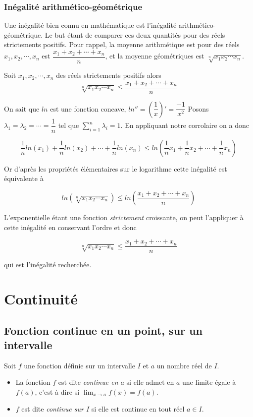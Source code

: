 \documentclass[french]{book}
\newcommand{\ie}{\leq}
\begin{document}
\subsection{Inégalité arithmético-géométrique }

Une inégalité bien connu en mathématique est l'inégalité arithmético-géométrique. Le but étant de comparer ces deux quantités pour des réels strictements positifs. Pour rappel, la moyenne arithmétique est pour des réels $x_1,x_2, \cdots , x_n$ est $\dfrac{x_1+x_2+\cdots+x_n}{n}$, et la moyenne géométriques est $\sqrt[n]{x_1x_2\cdots x_n}$.

\begin{thm}
Soit  $x_1,x_2, \cdots , x_n$ des réels strictements positifs alors 
$$\sqrt[n]{x_1x_2\cdots x_n} \ie \dfrac{x_1+x_2+\cdots+x_n}{n} $$
\end{thm}

\begin{demo}
On sait que $ln$ est une fonction concave, \emph{$ln''=(\dfrac{1}{x})'=\dfrac{-1}{x^2}$}  Posons $\lambda_1=\lambda_2=\cdots=\dfrac{1}{n}$ tel que $\sum_{i=1}^{n} \lambda_i =1$. En appliquant notre corrolaire on a donc 

$$\dfrac{1}{n} ln(x_1) + \dfrac{1}{n} ln(x_2) + \cdots +\dfrac{1}{n} ln(x_n) \ie ln( \dfrac{1}{n}x_1 +\dfrac{1}{n}x_2 + \cdots + \dfrac{1}{n}x_n )$$

Or d'après les propriétés élémentaires sur le logarithme cette inégalité est équivalente à

$$ln(\sqrt[n]{x_1x_2\cdots x_n}) \ie ln( \dfrac{x_1+x_2+\cdots+x_n}{n} )$$

L'exponentielle étant une fonction \emph{strictement} croissante, on peut l'appliquer à cette inégalité en conservant l'ordre et donc 

$$\sqrt[n]{x_1x_2\cdots x_n} \ie \dfrac{x_1+x_2+\cdots+x_n}{n} $$

qui est l'inégalité recherchée.
\end{demo}

\chapter{Continuité}
\section{Fonction continue en un point, sur un intervalle}

\begin{defn}
 Soit $f$ une fonction définie sur un intervalle  $I$ et $a$ un nombre réel de $I$.
\begin{itemize}
 \item[$\bullet$] La fonction $f$ est dite \emph{continue en $a$} si elle admet en $a$ une limite égale à $f(a)$, c'est  à dire si $\lim_{x\rightarrow a}f(x)=f(a)$.
\item[$\bullet$] $f$ est dite \emph{continue sur $I$} si elle est continue en tout réel $a\in I$.
\end{itemize}
\end{defn}
\end{document}
